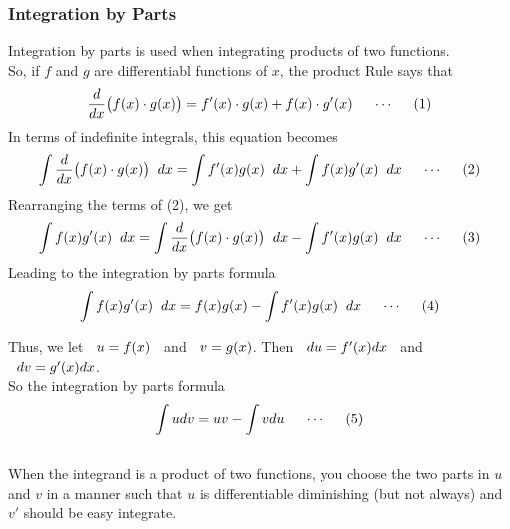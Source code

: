 \documentclass[11pt,a4paper]{article}
\begin{document}
\subsubsection{Integration by Parts}
Integration by parts is used when integrating products of two functions.\\
So, if $f$ and $g$ are differentiabl functions of $x$, the product Rule says that
$$\dfrac{d}{dx}\big(f(x)\cdot g(x)\big) = f'(x)\cdot g(x) + f(x)\cdot g'(x)\hspace{0.5cm} \cdots\hspace{0.5cm} (1)$$
In terms of indefinite integrals, this equation becomes 
$$\int\dfrac{d}{dx}\big(f(x)\cdot g(x)\big)\hspace{0.2cm}dx = \int f'(x)g(x)\hspace{0.2cm}dx + \int f(x) g'(x)\hspace{0.2cm}dx \hspace{0.5cm} \cdots\hspace{0.5cm} (2)$$
Rearranging the terms of (2), we get 
$$\int f(x) g'(x)\hspace{0.2cm}dx = \int\dfrac{d}{dx}\big(f(x)\cdot g(x)\big)\hspace{0.2cm}dx- \int f'(x)g(x)\hspace{0.2cm}dx  \hspace{0.5cm} \cdots\hspace{0.5cm} (3)$$
Leading to the integration by parts formula
$$\int f(x) g'(x)\hspace{0.2cm}dx = f(x)g(x)- \int f'(x)g(x)\hspace{0.2cm}dx  \hspace{0.5cm} \cdots\hspace{0.5cm} (4)$$

Thus, we let $\hspace{0.2cm} u = f(x)\hspace{0.2cm}$ and $\hspace{0.2cm} v = g(x)$. Then $\hspace{0.2cm} du = f'(x)dx\hspace{0.2cm}$ and $\hspace{0.2cm} dv = g'(x)dx$.\\

So the integration by parts formula 
$$\int u dv = uv - \int vdu  \hspace{0.5cm}\cdots\hspace{0.5cm} (5) $$\\



When the integrand is a product of two functions, you choose the two parts in $u$ and $v$ in a manner such that $u$ is differentiable diminishing (but not always) and $v'$ should be easy integrate.\\\\
\end{document}
